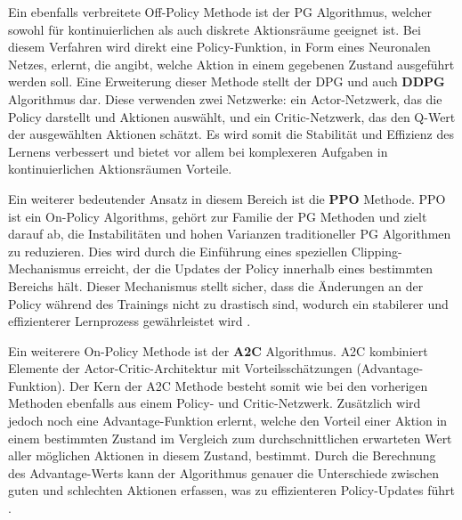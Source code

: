 Ein ebenfalls verbreitete Off-Policy Methode ist der \ac{PG} Algorithmus, welcher sowohl für kontinuierlichen als auch diskrete Aktionsräume geeignet ist. Bei diesem Verfahren wird direkt eine Policy-Funktion, in Form eines Neuronalen Netzes, erlernt, die angibt, welche Aktion in einem gegebenen Zustand ausgeführt werden soll.
Eine Erweiterung dieser Methode stellt der \ac{DPG} und auch \textbf{\ac{DDPG}} Algorithmus dar. Diese verwenden zwei Netzwerke: ein Actor-Netzwerk, das die Policy darstellt und Aktionen auswählt, und ein Critic-Netzwerk, das den Q-Wert der ausgewählten Aktionen schätzt. Es wird somit die Stabilität und Effizienz des Lernens verbessert und bietet vor allem bei komplexeren Aufgaben in kontinuierlichen Aktionsräumen Vorteile. 

Ein weiterer bedeutender Ansatz in diesem Bereich ist die \textbf{\ac{PPO}} Methode. \ac{PPO} ist ein On-Policy Algorithms, gehört zur Familie der \ac{PG} Methoden und zielt darauf ab, die Instabilitäten und hohen Varianzen traditioneller \ac{PG} Algorithmen zu reduzieren. Dies wird durch die Einführung eines speziellen Clipping-Mechanismus erreicht, der die Updates der Policy innerhalb eines bestimmten Bereichs hält. Dieser Mechanismus stellt sicher, dass die Änderungen an der Policy während des Trainings nicht zu drastisch sind, wodurch ein stabilerer und effizienterer Lernprozess gewährleistet wird \cite{SchulmanWDRK17}.

Ein weiterere On-Policy Methode ist der \textbf{\ac{A2C}} Algorithmus.
\ac{A2C} kombiniert Elemente der Actor-Critic-Architektur mit Vorteilsschätzungen (Advantage-Funktion). Der Kern der \ac{A2C} Methode besteht somit wie bei den vorherigen Methoden ebenfalls aus einem Policy- und Critic-Netzwerk. Zusätzlich wird jedoch noch eine Advantage-Funktion erlernt, welche den Vorteil einer Aktion in einem bestimmten Zustand im Vergleich zum durchschnittlichen erwarteten Wert aller möglichen Aktionen in diesem Zustand, bestimmt. Durch die Berechnung des Advantage-Werts kann der Algorithmus genauer die Unterschiede zwischen guten und schlechten Aktionen erfassen, was zu effizienteren Policy-Updates führt \cite{MnihBMGLHSK16}.


